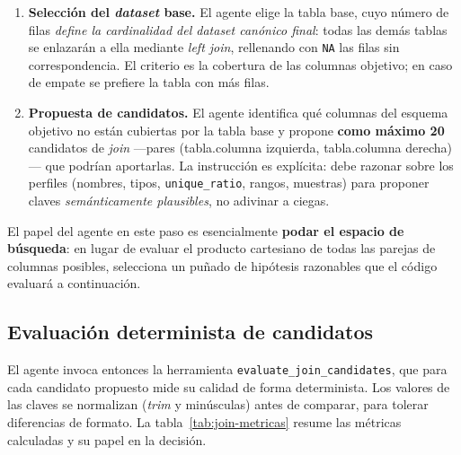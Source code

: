 \begin{enumerate}
  \item \textbf{Selección del \textit{dataset} base.} El agente elige la tabla base, cuyo
        número de filas \emph{define la cardinalidad del dataset canónico final}: todas
        las demás tablas se enlazarán a ella mediante \textit{left join}, rellenando con
        \texttt{NA} las filas sin correspondencia. El criterio es la cobertura de las
        columnas objetivo; en caso de empate se prefiere la tabla con más filas.
  \item \textbf{Propuesta de candidatos.} El agente identifica qué columnas del esquema
        objetivo no están cubiertas por la tabla base y propone \textbf{como máximo 20}
        candidatos de \textit{join} —pares (tabla.columna izquierda, tabla.columna
        derecha)— que podrían aportarlas. La instrucción es explícita: debe razonar sobre
        los perfiles (nombres, tipos, \texttt{unique\_ratio}, rangos, muestras) para
        proponer claves \emph{semánticamente plausibles}, no adivinar a ciegas.
\end{enumerate}

El papel del agente en este paso es esencialmente \textbf{podar el espacio de búsqueda}:
en lugar de evaluar el producto cartesiano de todas las parejas de columnas posibles,
selecciona un puñado de hipótesis razonables que el código evaluará a continuación.

\subsection{Evaluación determinista de candidatos}
\label{sec:join-evaluacion}

El agente invoca entonces la herramienta \texttt{evaluate\_join\_candidates}, que para
cada candidato propuesto mide su calidad de forma determinista. Los valores de las claves
se normalizan (\textit{trim} y minúsculas) antes de comparar, para tolerar diferencias de
formato. La tabla~\ref{tab:join-metricas} resume las métricas calculadas y su papel en la
decisión.

